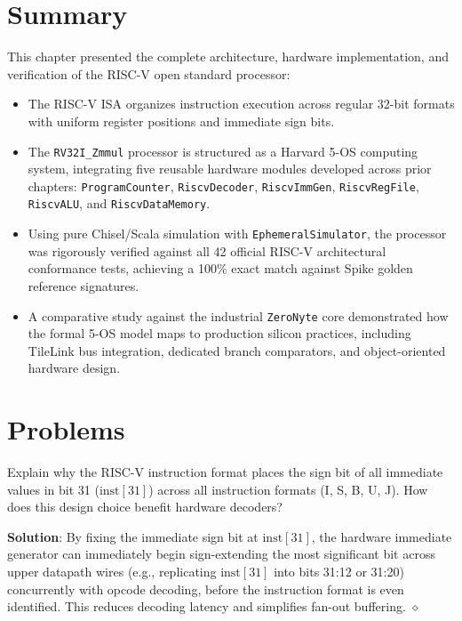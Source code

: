 \section{Summary}\label{riscvSummary}

This chapter presented the complete architecture, hardware implementation, and verification of the RISC-V open standard processor:
\begin{itemize}
    \item The RISC-V ISA organizes instruction execution across regular 32-bit formats with uniform register positions and immediate sign bits.
    \item The \texttt{RV32I\_Zmmul} processor is structured as a Harvard 5-OS computing system, integrating five reusable hardware modules developed across prior chapters: \texttt{ProgramCounter}, \texttt{RiscvDecoder}, \texttt{RiscvImmGen}, \texttt{RiscvRegFile}, \texttt{RiscvALU}, and \texttt{RiscvDataMemory}.
    \item Using pure Chisel/Scala simulation with \texttt{EphemeralSimulator}, the processor was rigorously verified against all 42 official RISC-V architectural conformance tests, achieving a 100\% exact match against Spike golden reference signatures.
    \item A comparative study against the industrial \texttt{ZeroNyte} core demonstrated how the formal 5-OS model maps to production silicon practices, including TileLink bus integration, dedicated branch comparators, and object-oriented hardware design.
\end{itemize}


\section{Problems}\label{riscvProblems}

\begin{problem}
Explain why the RISC-V instruction format places the sign bit of all immediate values in bit 31 ($\text{inst}[31]$) across all instruction formats (I, S, B, U, J). How does this design choice benefit hardware decoders?

\textbf{Solution}:
By fixing the immediate sign bit at $\text{inst}[31]$, the hardware immediate generator can immediately begin sign-extending the most significant bit across upper datapath wires (e.g., replicating $\text{inst}[31]$ into bits 31:12 or 31:20) concurrently with opcode decoding, before the instruction format is even identified. This reduces decoding latency and simplifies fan-out buffering.
$\diamond$
\end{problem}

